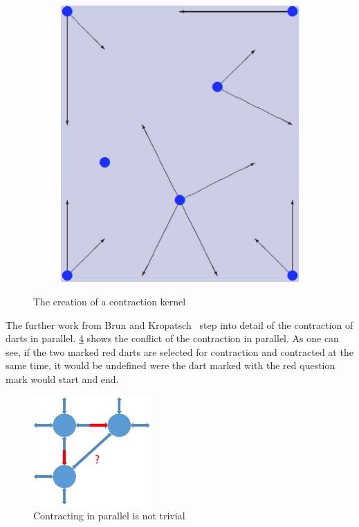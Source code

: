 \documentclass[12pt]{article}
\begin{document}
\begin{figure}[tb]
\begin{subfigure}[b]{0.2\textwidth}
      \caption{}\label{fig:contract_kernel7}
  \end{subfigure}
  ~
  \begin{subfigure}[b]{0.2\textwidth}
      \includegraphics[width=\textwidth]{img/contract_kernel8}
      \caption{}\label{fig:contract_kernel8}
  \end{subfigure}

  \caption{The creation of a contraction kernel}
  \label{fig:creationg_of_a_kernel}
\end{figure}

The further work from Brun and Kropatsch~\cite{brun2003contraction} step into detail of the contraction of darts in parallel. \cref{fig:parallel} shows the conflict of the contraction in parallel. As one can see, if the two marked red darts are selected for contraction and contracted at the same time, it would be undefined were the dart marked with the red question mark would start and end.

\begin{figure}[tb]
  \centering
  \includegraphics[width=0.4\textwidth]{img/compar.pdf}
  \caption{Contracting in parallel is not trivial}
  \label{fig:parallel}
\end{figure}
\end{document}
